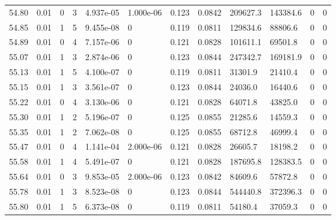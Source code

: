 \documentclass[preview]{standalone}
\begin{document}
{{{{{{{{{{{{{{{\begin{tabular}{L{1.2cm}C{1.2cm} C{0.3cm}C{0.5cm} C{1.4cm}C{1.4cm} C{1.4cm}C{1.4cm} C{1.6cm}C{1.6cm} C{1.6cm}C{1.6cm}}
  54.80  &  0.01  & 0     &  3 &  4.937e-05  & 1.000e-06  &  0.123&   0.0842& 209627.3 & 143384.6   &  0 & 0  \\ 
  54.85  &  0.01  & 1     &  5 &  9.455e-08  & 0  &  0.119&   0.0811& 129834.6 & 88806.6   &  0 & 0  \\ 
  54.89  &  0.01  & 0     &  4 &  7.157e-06  & 0  &  0.121&   0.0828& 101611.1 & 69501.8   &  0 & 0  \\ 
  55.07  &  0.01  & 1     &  3 &  2.874e-06  & 0  &  0.123&   0.0844& 247342.7 & 169181.9   &  0 & 0  \\ 
  55.13  &  0.01  & 1     &  5 &  4.100e-07  & 0  &  0.119&   0.0811& 31301.9 & 21410.4   &  0 & 0  \\ 
  55.15  &  0.01  & 1     &  3 &  3.561e-07  & 0  &  0.123&   0.0844& 24036.0 & 16440.6   &  0 & 0  \\ 
  55.22  &  0.01  & 0     &  4 &  3.130e-06  & 0  &  0.121&   0.0828& 64071.8 & 43825.0   &  0 & 0  \\ 
  55.30  &  0.01  & 1     &  2 &  5.196e-07  & 0  &  0.125&   0.0855& 21285.6 & 14559.3   &  0 & 0  \\ 
  55.35  &  0.01  & 1     &  2 &  7.062e-08  & 0  &  0.125&   0.0855& 68712.8 & 46999.4   &  0 & 0  \\ 
  55.47  &  0.01  & 0     &  4 &  1.141e-04  & 2.000e-06  &  0.121&   0.0828& 26605.7 & 18198.2   &  0 & 0  \\ 
  55.58  &  0.01  & 1     &  4 &  5.491e-07  & 0  &  0.121&   0.0828& 187695.8 & 128383.5   &  0 & 0  \\ 
  55.64  &  0.01  & 0     &  3 &  9.853e-05  & 2.000e-06  &  0.123&   0.0842& 84609.6 & 57872.8   &  0 & 0  \\ 
  55.78  &  0.01  & 1     &  3 &  8.523e-08  & 0  &  0.123&   0.0844& 544440.8 & 372396.3   &  0 & 0  \\ 
  55.80  &  0.01  & 1     &  5 &  6.373e-08  & 0  &  0.119&   0.0811& 54180.4 & 37059.3   &  0 & 0  \\ 
\hline 
\end{tabular} 

}}}}}}}}}}}}}}}
\end{document}

